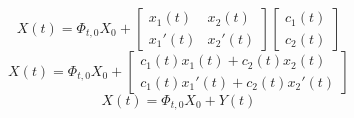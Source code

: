 \documentclass{article}
\begin{document}
$$X(t) = \Phi_{t,0}X_0 + \begin{bmatrix}
    x_1(t) & x_2(t)\\
    x_1'(t) & x_2'(t)
\end{bmatrix} \begin{bmatrix}
    c_1(t)\\
    c_2(t)
\end{bmatrix}$$
$$X(t) = \Phi_{t,0}X_0 + \begin{bmatrix}
    c_1(t)x_1(t) + c_2(t)x_2(t)\\
    c_1(t)x_1'(t) + c_2(t)x_2'(t)
\end{bmatrix}$$
$$X(t) = \Phi_{t,0}X_0 + Y(t)$$
\end{document}

